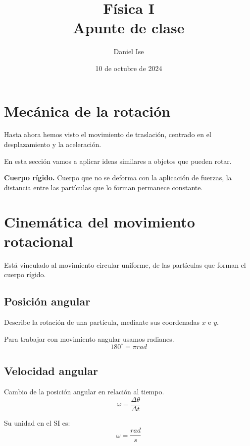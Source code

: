\documentclass[12pt]{article}
\title{Física I\\Apunte de clase}
\author{Daniel Ise}
\date{10 de octubre de 2024}
\begin{document}
\maketitle

\tableofcontents

\section{Mecánica de la rotación}

Hasta ahora hemos visto el movimiento de traslación,
centrado en el desplazamiento y la aceleración.

En esta sección vamos a aplicar ideas similares a objetos que pueden rotar.

\textbf{Cuerpo rígido.}
Cuerpo que no se deforma con la aplicación de fuerzas,
la distancia entre las partículas que lo forman permanece constante.

\section{Cinemática del movimiento rotacional}

Está vinculado al movimiento circular uniforme,
de las partículas que forman el cuerpo rígido.

\subsection{Posición angular}

Describe la rotación de una partícula,
mediante sus coordenadas \(x\) e \(y\).

Para trabajar con movimiento angular usamos radianes.
\begin{equation}
    180^{\circ} = \pi rad
\end{equation}

\subsection{Velocidad angular}

Cambio de la posición angular en relación al tiempo.
\begin{equation}
    \omega = \frac{\Delta\theta}{\Delta t}
\end{equation}

Su unidad en el SI es:
\begin{equation}
    \omega = \frac{rad}{s}
\end{equation}
\end{document}
